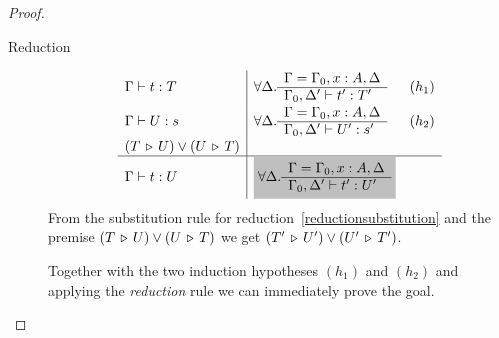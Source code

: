\begin{theorem}
\begin{proof}
\begin{description}
    \item[Reduction]
      $$
      \begin{array}{l|ll}
        \Gamma \vdash t:T
        & \forall \Delta .
          \rulev
          {\Gamma = \Gamma_0,x:A,\Delta}
          {\Gamma_0,\Delta' \vdash t': T'} & (h_1)
        \\
        \Gamma \vdash U: s
        & \forall \Delta .
          \rulev
          {\Gamma = \Gamma_0,x:A,\Delta}
          {\Gamma_0,\Delta' \vdash U': s'} & (h_2)
        \\
        (T \reduce U) \lor (U \reduce T)
        \\
        \hline %
        \Gamma \vdash t:U
        & \goalbg{
          \forall \Delta .
          \rulev
          {\Gamma = \Gamma_0,x:A,\Delta}
          {\Gamma_0,\Delta' \vdash t': U'}
          }
      \end{array}
      $$
      From the substitution rule for reduction~\ref{reductionsubstitution} and
      the premise $(T \,\triangleright\, U) \lor (U \,\triangleright\, T)$ we get
      $(T' \,\triangleright\, U') \lor (U' \,\triangleright\, T')$.

      Together with the two induction hypotheses $(h_1)$ and $(h_2)$ and
      applying the \emph{reduction} rule we can immediately prove the goal.
    \end{description}
  \end{proof}
\end{theorem}










